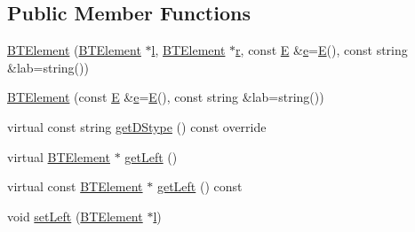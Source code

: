 \subsection*{Public Member Functions}
\begin{DoxyCompactItemize}
\item 
\mbox{\hyperlink{classbridges_1_1_b_t_element_a8abf38e5d2d70c247de6a6fe6b90bf1b}{B\+T\+Element}} (\mbox{\hyperlink{classbridges_1_1_b_t_element}{B\+T\+Element}} $\ast$\mbox{\hyperlink{namespacebridges_acfb0a4f7877d8f63de3e6862004c50eda2db95e8e1a9267b7a1188556b2013b33}{l}}, \mbox{\hyperlink{classbridges_1_1_b_t_element}{B\+T\+Element}} $\ast$\mbox{\hyperlink{namespacebridges_acfb0a4f7877d8f63de3e6862004c50eda4b43b0aee35624cd95b910189b3dc231}{r}}, const \mbox{\hyperlink{namespacebridges_acfb0a4f7877d8f63de3e6862004c50eda3a3ea00cfc35332cedf6e5e9a32e94da}{E}} \&\mbox{\hyperlink{namespacebridges_acfb0a4f7877d8f63de3e6862004c50edae1671797c52e15f763380b45e841ec32}{e}}=\mbox{\hyperlink{namespacebridges_acfb0a4f7877d8f63de3e6862004c50eda3a3ea00cfc35332cedf6e5e9a32e94da}{E}}(), const string \&lab=string())
\item 
\mbox{\hyperlink{classbridges_1_1_b_t_element_afdc1d11d1d65b23007334d337c279c3a}{B\+T\+Element}} (const \mbox{\hyperlink{namespacebridges_acfb0a4f7877d8f63de3e6862004c50eda3a3ea00cfc35332cedf6e5e9a32e94da}{E}} \&\mbox{\hyperlink{namespacebridges_acfb0a4f7877d8f63de3e6862004c50edae1671797c52e15f763380b45e841ec32}{e}}=\mbox{\hyperlink{namespacebridges_acfb0a4f7877d8f63de3e6862004c50eda3a3ea00cfc35332cedf6e5e9a32e94da}{E}}(), const string \&lab=string())
\item 
virtual const string \mbox{\hyperlink{classbridges_1_1_b_t_element_a43cc18d2c1e71c399782a306b60e4260}{get\+D\+Stype}} () const override
\item 
virtual \mbox{\hyperlink{classbridges_1_1_b_t_element}{B\+T\+Element}} $\ast$ \mbox{\hyperlink{classbridges_1_1_b_t_element_ab5955c2611b6ae8c3c48508e3e983f87}{get\+Left}} ()
\item 
virtual const \mbox{\hyperlink{classbridges_1_1_b_t_element}{B\+T\+Element}} $\ast$ \mbox{\hyperlink{classbridges_1_1_b_t_element_a01ebba851e9cc6ec77df16201604597a}{get\+Left}} () const
\item 
void \mbox{\hyperlink{classbridges_1_1_b_t_element_a86f58ed6311eeb7eddc76188c423781c}{set\+Left}} (\mbox{\hyperlink{classbridges_1_1_b_t_element}{B\+T\+Element}} $\ast$\mbox{\hyperlink{namespacebridges_acfb0a4f7877d8f63de3e6862004c50eda2db95e8e1a9267b7a1188556b2013b33}{l}})
\item 

\end{DoxyCompactItemize}
